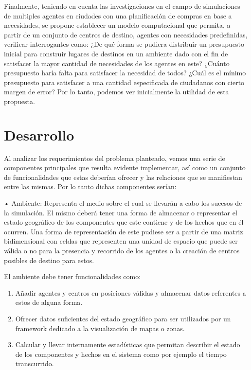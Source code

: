 \documentclass[12pt]{amsart}
\begin{document}
Finalmente, teniendo en cuenta las investigaciones en el campo de simulaciones de multiples agentes en ciudades con una planificación de compras en base a necesidades, se propone establecer un modelo computacional que permita, a partir de un conjunto de centros de destino, agentes con necesidades predefinidas, verificar interrogantes como: ¿De qué forma se pudiera distribuir un presupuesto inicial para construir lugares de destinos en un ambiente dado con el fin de satisfacer la mayor cantidad de necesidades de los agentes en este? ¿Cuánto presupuesto haría falta para satisfacer la necesidad de todos? ¿Cuál es el mínimo presupuesto para satisfacer a una cantidad especificada de ciudadanos con cierto margen de error? Por lo tanto, podemos ver inicialmente la utilidad de esta propuesta.

\section{Desarrollo}

Al analizar los requerimientos del problema planteado, vemos una serie de componentes principales que resulta evidente implementar, así como un conjunto de funcionalidades que estas deberían ofrecer y las relaciones que se manifiestan entre las mismas. Por lo tanto dichas componentes serían:

•	Ambiente: Representa el medio sobre el cual se llevarán a cabo los sucesos de la simulación. El mismo deberá tener una forma de almacenar o representar el estado geográfico de los componentes que este contiene y de los hechos que en él ocurren. Una forma de representación de este pudiese ser a partir de una matriz bidimensional con celdas que representen una unidad de espacio que puede ser válida o no para la presencia y recorrido de los agentes o la creación de centros posibles de destino para estos.

El ambiente debe tener funcionalidades como:
\begin {enumerate}
			\item Añadir agentes y centros en posiciones válidas y almacenar datos referentes a estos de alguna forma.
			\item Ofrecer datos suficientes del estado geográfico para ser utilizados por un framework dedicado a la visualización de mapas o zonas.
			\item Calcular y llevar internamente estadísticas que permitan describir el estado de los componentes y hechos en el sistema como por ejemplo el tiempo transcurrido.
\end {enumerate}
\end{document}
